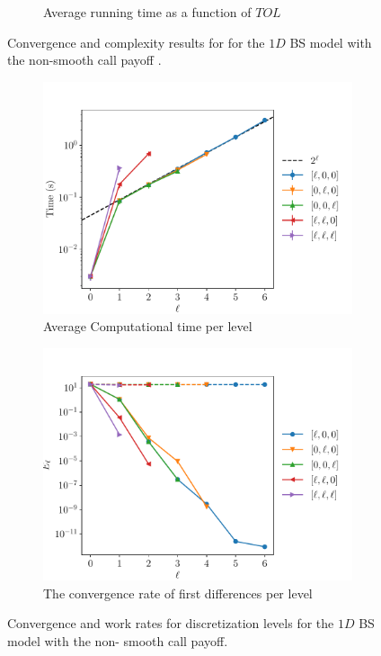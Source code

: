 \documentclass[11pt]{article}
\begin{document}
\begin{figure}[!h]
\begin{subfigure}{.5\textwidth}
		\caption{Average running time as a function of $TOL$}
		\label{fig:misc_1D_BS_non_smooth_4steps_sub2}
	\end{subfigure}%
	\caption{Convergence and complexity results for for the $1D$ BS model with the non-smooth call payoff .}
	\label{fig:misc_1D_BS_nonsmooth_4steps_2}
\end{figure}



\begin{figure}[!h]
	\centering
	\begin{subfigure}{.5\textwidth}
		\centering
		\includegraphics[width=0.95\linewidth]{./figures/1D_BS_4_steps_non_smooth/level_work.pdf}
		\caption{Average Computational time per level}
		\label{fig:misc_1D_BS_non_smooth_4steps_sub3}
	\end{subfigure}%
	\begin{subfigure}{.5\textwidth}
		\centering
		\includegraphics[width=0.95\linewidth]{./figures/1D_BS_4_steps_non_smooth/levels_error_rate.pdf}
		\caption{ The convergence rate of first differences per level}
		\label{fig:misc_1D_BS_non_smooth_4steps_sub4}
	\end{subfigure}%
	\caption{Convergence and work rates for discretization levels for the $1D$ BS model with the non- smooth call payoff.}
	\label{fig:misc_1D_BS_4teps_2}
\end{figure}
\end{document}

